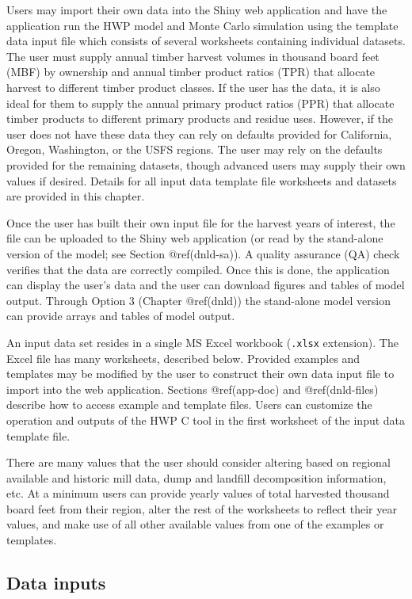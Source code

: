 \documentclass[
  openany]{book}
\begin{document}
Users may import their own data into the Shiny web application and have
the application run the HWP model and Monte Carlo simulation using the
template data input file which consists of several worksheets containing
individual datasets. The user must supply annual timber harvest volumes
in thousand board feet (MBF) by ownership and annual timber product
ratios (TPR) that allocate harvest to different timber product classes.
If the user has the data, it is also ideal for them to supply the annual
primary product ratios (PPR) that allocate timber products to different
primary products and residue uses. However, if the user does not have
these data they can rely on defaults provided for California, Oregon,
Washington, or the USFS regions. The user may rely on the defaults
provided for the remaining datasets, though advanced users may supply
their own values if desired. Details for all input data template file
worksheets and datasets are provided in this chapter.

Once the user has built their own input file for the harvest years of
interest, the file can be uploaded to the Shiny web application (or read
by the stand-alone version of the model; see Section @ref(dnld-sa)). A
quality assurance (QA) check verifies that the data are correctly
compiled. Once this is done, the application can display the user's data
and the user can download figures and tables of model output. Through
Option 3 (Chapter @ref(dnld)) the stand-alone model version can provide
arrays and tables of model output.

An input data set resides in a single MS Excel workbook (\texttt{.xlsx}
extension). The Excel file has many worksheets, described below.
Provided examples and templates may be modified by the user to construct
their own data input file to import into the web application. Sections
@ref(app-doc) and @ref(dnld-files) describe how to access example and
template files. Users can customize the operation and outputs of the HWP
C tool in the first worksheet of the input data template file.

There are many values that the user should consider altering based on
regional available and historic mill data, dump and landfill
decomposition information, etc. At a minimum users can provide yearly
values of total harvested thousand board feet from their region, alter
the rest of the worksheets to reflect their year values, and make use of
all other available values from one of the examples or templates.

\hypertarget{own-over-inputSum}{%
\subsection{Data inputs}\label{own-over-inputSum}}
\end{document}
